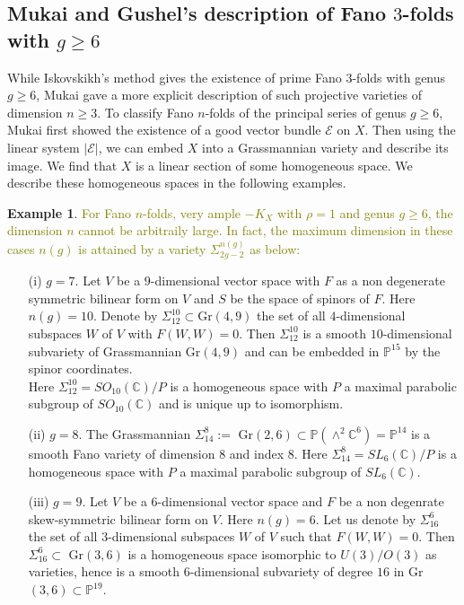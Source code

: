 \documentclass[11pt]{amsart}
\theoremstyle{plain}
\theoremstyle{definition}
\newtheorem{example}[theorem]{Example}
\theoremstyle{expl}
\begin{document}
\subsection{Mukai and Gushel's description of Fano $3$-folds with $g\geq 6$}
While Iskovskikh's method gives the existence of prime Fano $3$-folds with genus $g \geq 6$, Mukai gave a more explicit description of such projective varieties of dimension $n\geq 3$. 
To classify Fano $n$-folds of the principal series of genus $g \geq 6$, Mukai first showed the existence of a good vector bundle $\mathcal{E}$ on $X$. Then using the linear system $|\mathcal{E}|$, we can embed $X$ into a Grassmannian variety and describe its image. We find that $X$ is a linear section of some homogeneous space. We describe these homogeneous spaces in the following examples.

\begin{example}
	\textcolor{olive}{For Fano $n$-folds, very ample $-K_X$ with $\rho=1$ and genus $g\geq 6$, the dimension $n$ cannot be arbitraily large. In fact, the maximum dimension in these cases $n(g)$ is attained by a variety $\Sigma_{2g-2}^{n(g)}$ as below:}
\begin{enumerate}
\item[(i)] $g=7$. Let $V$ be a $9$-dimensional vector space with $F$ as a non degenerate symmetric bilinear form on $V$ and $S$ be the space of spinors of $F$. Here $n(g)=10$. Denote by $\Sigma_{12}^{10} \subset $Gr$(4,9)$ the set of all $4$-dimensional subspaces $W$ of $V$ with $F(W,W)=0$. Then $\Sigma_{12}^{10}$ is a smooth $10$-dimensional subvariety of Grassmannian Gr$(4,9)$ and can be embedded in $\mathbb{P}^{15}$ by the spinor coordinates. \\
Here $\Sigma^{10}_{12} = SO_{10}(\mathbb{C})/P$ is a homogeneous space with $P$ a maximal parabolic subgroup of $SO_{10}(\mathbb{C})$ and is unique up to isomorphism.
\item[(ii)] $g=8$. The Grassmannian $\Sigma^8_{14}:=$ Gr$(2,6) \subset \mathbb{P}(\wedge^2 \mathbb{C}^6) = \mathbb{P}^{14}$ is a smooth Fano variety of dimension $8$ and index $8$.  Here $\Sigma^8_{14} = SL_6(\mathbb{C})/P$ is a homogeneous space with $P$ a maximal parabolic subgroup of $SL_6(\mathbb{C})$.
      \item[(iii)] $g=9$. Let $V$ be a $6$-dimensional vector space and $F$ be a non degenrate skew-symmetric bilinear form on $V$. Here $n(g)=6$. Let us denote by $\Sigma_{16}^6$ the set of all $3$-dimensional subspaces $W$ of $V$ such that $F(W,W)=0$. Then $\Sigma_{16}^6 \subset $ Gr$(3,6)$ is a homogeneous space isomorphic to $U(3)/O(3)$ as varieties, hence is a smooth $6$-dimensional subvariety of degree $16$ in Gr$(3,6)\subset  \mathbb{P}^{19}$.

\end{enumerate}
\end{example}
\end{document}
